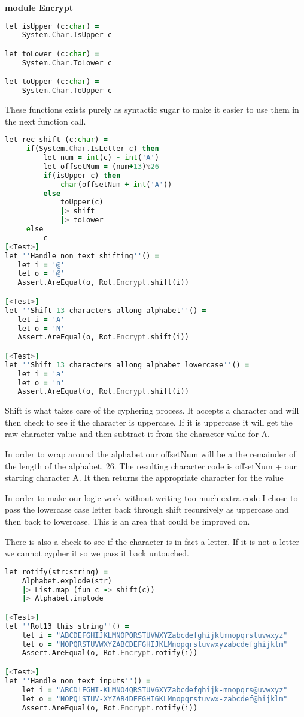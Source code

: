 \textbf{module Encrypt}

\begin{lstlisting}[language=F]
let isUpper (c:char) =
    System.Char.IsUpper c

let toLower (c:char) =
    System.Char.ToLower c

let toUpper (c:char) =
    System.Char.ToUpper c
\end{lstlisting}
These functions exists purely as syntactic sugar to make it easier to use them
in the next function call.

\begin{lstlisting}[language=F]
let rec shift (c:char) =
     if(System.Char.IsLetter c) then
         let num = int(c) - int('A')
         let offsetNum = (num+13)%26
         if(isUpper c) then
             char(offsetNum + int('A'))
         else
             toUpper(c)
             |> shift
             |> toLower
     else
         c
[<Test>]
let ''Handle non text shifting''() =
   let i = '@'
   let o = '@'
   Assert.AreEqual(o, Rot.Encrypt.shift(i))

[<Test>]
let ''Shift 13 characters allong alphabet''() =
   let i = 'A'
   let o = 'N'
   Assert.AreEqual(o, Rot.Encrypt.shift(i))

[<Test>]
let ''Shift 13 characters allong alphabet lowercase''() =
   let i = 'a'
   let o = 'n'
   Assert.AreEqual(o, Rot.Encrypt.shift(i))

\end{lstlisting}
Shift is what takes care of the cyphering process. It accepts a character
and will then check to see if the character is uppercase. If it is uppercase
it will get the raw character value and then subtract it from the character value
for A.

In order to wrap around the alphabet our offsetNum will be a the remainder of the length of the alphabet, 26.
The resulting character code is offsetNum + our starting character A. It then returns the appropriate character
for the value

In order to make our logic work without writing too much extra code I chose to pass the lowercase case letter
back through shift recursively as uppercase and then back to lowercase. This is an area that could be improved on.

There is also a check to see if the character is in fact a letter. If it is not a letter we cannot cypher it so we pass it back untouched.

\begin{lstlisting}[language=F]
let rotify(str:string) =
    Alphabet.explode(str)
    |> List.map (fun c -> shift(c))
    |> Alphabet.implode

[<Test>]
let ''Rot13 this string''() =
    let i = "ABCDEFGHIJKLMNOPQRSTUVWXYZabcdefghijklmnopqrstuvwxyz"
    let o = "NOPQRSTUVWXYZABCDEFGHIJKLMnopqrstuvwxyzabcdefghijklm"
    Assert.AreEqual(o, Rot.Encrypt.rotify(i))

[<Test>]
let ''Handle non text inputs''() =
    let i = "ABCD!FGHI-KLMNO4QRSTUV6XYZabcdefghijk-mnopqrs@uvwxyz"
    let o = "NOPQ!STUV-XYZAB4DEFGHI6KLMnopqrstuvwx-zabcdef@hijklm"
    Assert.AreEqual(o, Rot.Encrypt.rotify(i))
\end{lstlisting}

